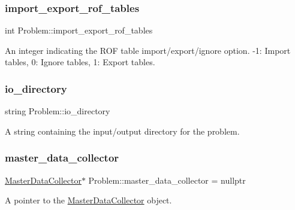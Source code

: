 \subsubsection{\texorpdfstring{import\+\_\+export\+\_\+rof\+\_\+tables}{import\_export\_rof\_tables}}
{\footnotesize\ttfamily int Problem\+::import\+\_\+export\+\_\+rof\+\_\+tables\hspace{0.3cm}{\ttfamily [protected]}}



An integer indicating the R\+OF table import/export/ignore option. -\/1\+: Import tables, 0\+: Ignore tables, 1\+: Export tables. 

\mbox{\label{classProblem_ac58848a0d808cf040c3fb3676b4a236f}} 
\subsubsection{\texorpdfstring{io\+\_\+directory}{io\_directory}}
{\footnotesize\ttfamily string Problem\+::io\+\_\+directory\hspace{0.3cm}{\ttfamily [protected]}}



A string containing the input/output directory for the problem. 

\mbox{\label{classProblem_a6cd1db1d587a449985d6514390ba8c96}} 
\subsubsection{\texorpdfstring{master\+\_\+data\+\_\+collector}{master\_data\_collector}}
{\footnotesize\ttfamily \mbox{\hyperlink{classMasterDataCollector}{Master\+Data\+Collector}}$\ast$ Problem\+::master\+\_\+data\+\_\+collector = nullptr\hspace{0.3cm}{\ttfamily [protected]}}



A pointer to the \mbox{\hyperlink{classMasterDataCollector}{Master\+Data\+Collector}} object. 

\mbox{\label{classProblem_a270a5672643bfe09e52e0f24e1884136}} 
